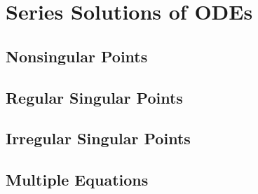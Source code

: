 \chapter{Series Solutions of ODEs}
\label{ODE:Series:Chap}

\section{Nonsingular Points}

\section{Regular Singular Points}

\section{Irregular Singular Points}

\section{Multiple Equations}





